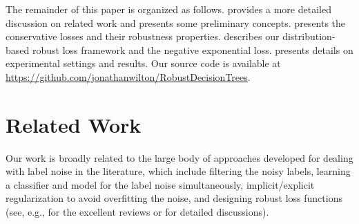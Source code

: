 \documentclass[letterpaper]{article} %
\begin{document}
The remainder of this paper is organized as follows.
 provides a more detailed discussion on related work and 
 presents some preliminary concepts.
 presents the conservative losses and their robustness
properties.
 describes our distribution-based robust loss framework
and the negative exponential loss.
 presents details on experimental settings and results.
Our source code is available at \url{https://github.com/jonathanwilton/RobustDecisionTrees}.

\section{Related Work} \label{sec:related}

Our work is broadly related to the large body of approaches developed for
dealing with label noise in the literature, which include filtering the noisy
labels, learning a classifier and model for the label noise simultaneously,
implicit/explicit regularization to avoid overfitting the noise,
and designing robust loss functions (see, e.g., for the excellent reviews
\cite{frenay2013classification} or \cite{song2022learning} for detailed
discussions).
\end{document}
